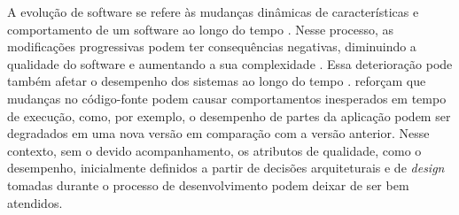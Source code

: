 A evolução de software se refere às mudanças dinâmicas de características e comportamento de um software ao longo do tempo \cite{Pablo2016}. Nesse processo, as modificações progressivas podem ter consequências negativas, diminuindo a qualidade do software e aumentando a sua complexidade \cite{BeladyLaszloA.andLehman1976}\cite{LehmanMeirMandRamilJuanFandWernickPaulDandPerryDewayneEandTurski}. Essa deterioração pode também afetar o desempenho dos sistemas ao longo do tempo \cite{Molyneaux2009}. \citeauthor{SandovalAlcocer2013} reforçam que mudanças no código-fonte podem causar comportamentos inesperados em tempo de execução, como, por exemplo, o desempenho de partes da aplicação podem ser degradados em uma nova versão em comparação com a versão anterior. Nesse contexto, sem o devido acompanhamento, os atributos de qualidade, como o desempenho, inicialmente definidos a partir de decisões arquiteturais e de \textit{design} tomadas durante o processo de desenvolvimento podem deixar de ser bem atendidos.





